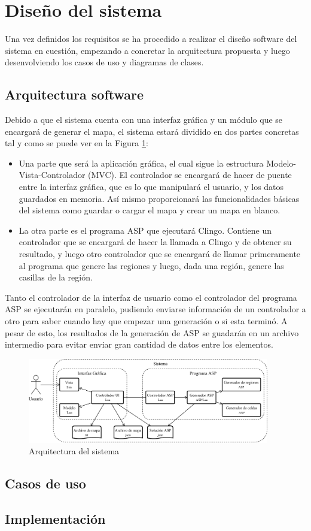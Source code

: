 \section{Diseño del sistema}

Una vez definidos los requisitos se ha procedido a realizar el diseño software del sistema en cuestión, empezando a concretar la arquitectura propuesta y luego desenvolviendo los casos de uso y diagramas de clases.

\subsection{Arquitectura software}

Debido a que el sistema cuenta con una interfaz gráfica y un módulo que se encargará de generar el mapa, el sistema estará dividido en dos partes concretas tal y como se puede ver en la Figura \ref{fig:arquitectura}:

\begin{itemize}
	\item Una parte que será la aplicación gráfica, el cual sigue la estructura Modelo-Vista-Controlador (MVC). El controlador se encargará de hacer de puente entre la interfaz gráfica, que es lo que manipulará el usuario, y los datos guardados en memoria. Así mismo proporcionará las funcionalidades básicas del sistema como guardar o cargar el mapa y crear un mapa en blanco.
	\item La otra parte es el programa ASP que ejecutará Clingo. Contiene un controlador que se encargará de hacer la llamada a Clingo y de obtener su resultado, y luego otro controlador que se encargará de llamar primeramente al programa que genere las regiones y luego, dada una región, genere las casillas de la región.
\end{itemize}

Tanto el controlador de la interfaz de usuario como el controlador del programa ASP se ejecutarán en paralelo, pudiendo enviarse información de un controlador a otro para saber cuando hay que empezar una generación o si esta terminó. A pesar de esto, los resultados de la generación de ASP se guadarán en un archivo intermedio para evitar enviar gran cantidad de datos entre los elementos.

\begin{figure}
	\centering
	\includegraphics[height=10em]{images/arquitectura.pdf}
	\caption{Arquitectura del sistema}
	\label{fig:arquitectura}
\end{figure}

\subsection{Casos de uso}

\subsection{Implementación}